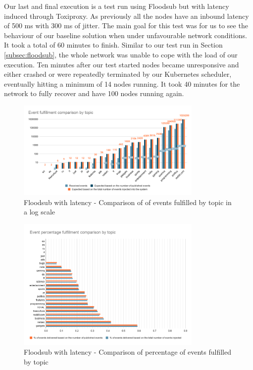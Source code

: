 Our last and final execution is a test run using Floodsub but with latency
induced through Toxiproxy. As previously all the nodes have an inbound latency
of 500 ms with 300 ms of jitter. The main goal for this test was for us to see
the behaviour of our baseline solution when under unfavourable network
conditions. It took a total of 60 minutes to finish. Similar to our test run in
Section \ref{subsec:floodsub}, the whole network was unable to cope with the
load of our execution. Ten minutes after our test started nodes became
unresponsive and either crashed or were repeatedly terminated by our Kubernetes
scheduler, eventually hitting a minimum of 14 nodes running. It took 40 minutes
for the network to fully recover and have 100 nodes running again.

\begin{figure}[!htb]
  \centering
  \includegraphics[width=0.8\textwidth]{img/graph-floodsub-latency-event-fulfillment-comparison.png}
  \caption{Floodsub with latency - Comparison of of events fulfilled by topic in a log scale}
  \label{fig:graph-floodsub-latency-event-fulfillment-comparison}
\end{figure}

\begin{figure}[!htb]
  \centering
  \includegraphics[width=0.8\textwidth]{img/graph-floodsub-latency-event-percentage-fulfillment-comparison.png}
  \caption{Floodsub with latency - Comparison of percentage of events fulfilled by topic}
  \label{fig:graph-floodsub-latency-event-percentage-fulfillment-comparison}
\end{figure}

